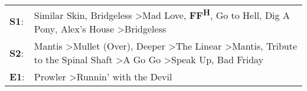 \begin{supertabular}{p{0.03\textwidth}p{0.92\textwidth}}
 \textbf{S1}:  &                                                                            Similar Skin\textsuperscript{}, \enspace Bridgeless\textsuperscript{} \textgreater \enspace Mad Love\textsuperscript{}, \enspace \textbf{FF\textsuperscript{H}}, \enspace Go to Hell\textsuperscript{}, \enspace Dig A Pony\textsuperscript{}, \enspace Alex's House\textsuperscript{} \textgreater \enspace Bridgeless\textsuperscript{}  \enspace  \\
 \textbf{S2}:  &  Mantis\textsuperscript{} \textgreater \enspace Mullet (Over)\textsuperscript{}, \enspace Deeper\textsuperscript{} \textgreater \enspace The Linear\textsuperscript{} \textgreater \enspace Mantis\textsuperscript{}, \enspace Tribute to the Spinal Shaft\textsuperscript{} \textgreater \enspace A Go Go\textsuperscript{} \textgreater \enspace Speak Up\textsuperscript{}, \enspace Bad Friday\textsuperscript{}  \enspace  \\
 \textbf{E1}:  &                                                                                                                                                                                                                                                                                                                             Prowler\textsuperscript{} \textgreater \enspace Runnin' with the Devil\textsuperscript{}  \enspace  \\
\end{supertabular}

